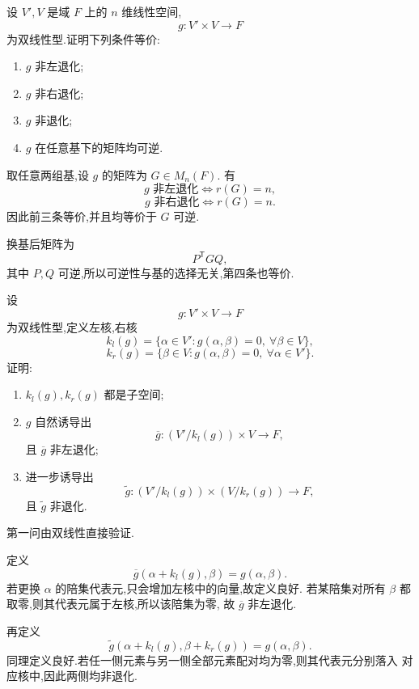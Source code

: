 \begin{example}
设 $V',V$ 是域 $F$ 上的 $n$ 维线性空间,
\[
g:V'\times V\to F
\]
为双线性型.证明下列条件等价:
\begin{enumerate}
    \item $g$ 非左退化;
    \item $g$ 非右退化;
    \item $g$ 非退化;
    \item $g$ 在任意基下的矩阵均可逆.
\end{enumerate}
\end{example}
\exampleblank

\begin{solution}
取任意两组基,设 $g$ 的矩阵为 $G\in M_n(F)$.
有
\[
g\text{ 非左退化}\iff r(G)=n,
\]
\[
g\text{ 非右退化}\iff r(G)=n.
\]
因此前三条等价,并且均等价于 $G$ 可逆.

换基后矩阵为
\[
P^{\mathsf T}GQ,
\]
其中 $P,Q$ 可逆,所以可逆性与基的选择无关,第四条也等价.
\end{solution}


\begin{example}
设
\[
g:V'\times V\to F
\]
为双线性型,定义左核,右核
\[
k_l(g)=\{\alpha\in V':g(\alpha,\beta)=0,\ \forall\beta\in V\},
\]
\[
k_r(g)=\{\beta\in V:g(\alpha,\beta)=0,\ \forall\alpha\in V'\}.
\]
证明:
\begin{enumerate}
    \item $k_l(g),k_r(g)$ 都是子空间;
    \item $g$ 自然诱导出
    \[
    \overline g:(V'/k_l(g))\times V\to F,
    \]
    且 $\overline g$ 非左退化;
    \item 进一步诱导出
    \[
    \widetilde g:(V'/k_l(g))\times(V/k_r(g))\to F,
    \]
    且 $\widetilde g$ 非退化.
\end{enumerate}
\end{example}
\exampleblank

\begin{solution}
第一问由双线性直接验证.

定义
\[
\overline g(\alpha+k_l(g),\beta)=g(\alpha,\beta).
\]
若更换 $\alpha$ 的陪集代表元,只会增加左核中的向量,故定义良好.
若某陪集对所有 $\beta$ 都取零,则其代表元属于左核,所以该陪集为零,
故 $\overline g$ 非左退化.

再定义
\[
\widetilde g(\alpha+k_l(g),\beta+k_r(g))=g(\alpha,\beta).
\]
同理定义良好.若任一侧元素与另一侧全部元素配对均为零,则其代表元分别落入
对应核中,因此两侧均非退化.
\end{solution}


